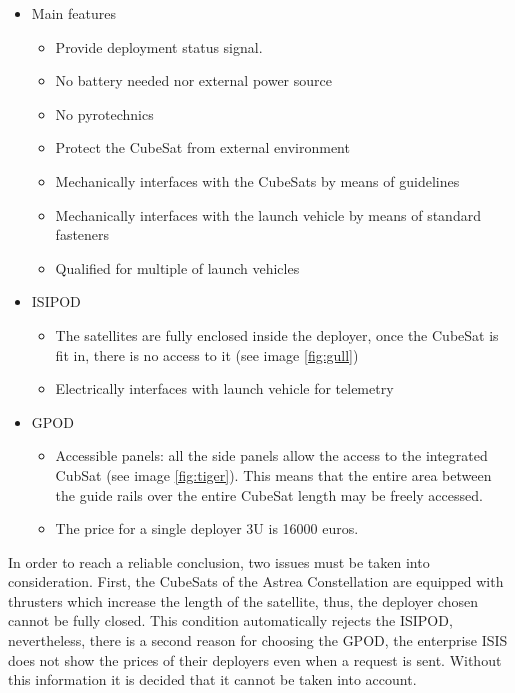 \begin{itemize}
\item Main features
\begin{itemize}
\item Provide deployment status signal.
\item No battery needed nor external power source
\item No pyrotechnics
\item Protect the CubeSat from external environment
\item Mechanically interfaces with the CubeSats by means of guidelines
\item Mechanically interfaces with the launch vehicle by means of standard fasteners
\item Qualified for multiple of launch vehicles
\end{itemize}
\item ISIPOD 
\begin{itemize}
\item The satellites are fully enclosed inside the deployer, once the CubeSat is fit in, there is no access to it (see image \ref{fig:gull})
\item Electrically interfaces with launch vehicle for telemetry
\end{itemize}
\item GPOD
\begin{itemize}
\item Accessible panels: all the side panels allow the access to the integrated CubSat (see image \ref{fig:tiger}). This means that the entire area between the guide rails over the entire CubeSat length may be freely accessed. 
\item The price for a single deployer 3U is 16000 euros. 
\end{itemize}
\end{itemize}
In order to reach a reliable conclusion, two issues must be taken into consideration. First, the CubeSats of the Astrea Constellation are equipped with thrusters which increase the length of the satellite, thus, the deployer chosen cannot be fully closed. This condition automatically rejects the ISIPOD, nevertheless, there is a second reason for choosing the GPOD, the enterprise ISIS does not show the prices of their deployers even when a request is sent. Without this information it is decided that it cannot be taken into account. 
\newline
